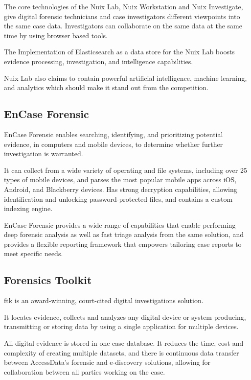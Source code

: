The core technologies of the Nuix Lab, Nuix Workstation and Nuix Investigate, give digital forensic technicians and case investigators 
different viewpoints into the same case data. Investigators can collaborate on 
the same data at the same time by using browser based tools.

The Implementation of Elasticsearch \cite{elasticsearch} as a data store for the Nuix Lab boosts evidence processing, investigation, and intelligence capabilities. 

Nuix Lab also claims to contain powerful artificial intelligence, machine learning, and analytics which should make it stand out from the competition. 

\subsection{EnCase Forensic}

EnCase Forensic \cite{encase} enables searching, identifying, and prioritizing potential evidence, in computers and mobile devices, to determine whether 
further investigation is warranted.

It can collect from a wide variety of operating and file systems, including over 25 types of mobile devices, and parses the most popular mobile apps across iOS, Android, and Blackberry devices.
Has strong decryption capabilities, allowing identification and unlocking password-protected files, and contains a custom indexing engine.

EnCase Forensic provides a wide range of capabilities that enable performing deep forensic analysis as well as fast triage analysis from the same solution, and provides a flexible
reporting framework that empowers tailoring case reports to meet specific needs.

\subsection{Forensics Toolkit}

\acrfull{ftk} \cite{ftk} is an award-winning, court-cited digital investigations solution. 

It locates evidence, collects and analyzes any digital device or system producing, transmitting or 
storing data by using a single application for multiple devices.

All digital evidence is stored in one case database. It reduces the time, cost and complexity of creating multiple datasets, and there is continuous data transfer between AccessData's forensic 
and e-discovery solutions, allowing for collaboration between all parties working on the case. 

